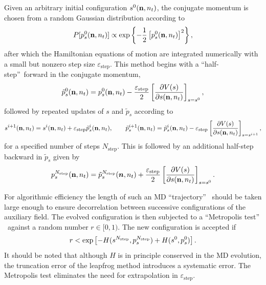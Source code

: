 Given an arbitrary initial configuration $s^{0}({{\bf n},n_t})$, the
conjugate momentum is chosen from a random Gaussian distribution according
to
\begin{equation}
P[p_s^{0}({\bf n},n_t)]\propto\exp\left\{  -\frac{1}{2}\left[  p_s^{0}({\bf
n},n_t)\right]  ^{2}\right\}  , \label{Gdistr}%
\end{equation}
after which the Hamiltonian equations of motion are integrated numerically
with a small but nonzero step size $\varepsilon_{\mathrm{step}}$.  This method begins
with a
\textquotedblleft half-step\textquotedblright\ forward in the conjugate
momentum,
\begin{equation}
\tilde{p}_s^{0}({\bf n},n_t)=p_s^{0}({\bf n},n_t)-\frac{\varepsilon
_{\mathrm{step}}}{2}\left[  \frac{\partial V(s)}{\partial s({\bf n},n_t%
)}\right]  _{s=s^{0}},
\end{equation}
followed by repeated updates of $s$ and $\tilde{p}_s$ according to
\begin{equation}
s^{i+1}({\bf n},n_t)=s^{i}({\bf n},n_t)+\varepsilon_{\mathrm{step}}%
\tilde{p}^{i}_s({\bf n},n_t),\quad\quad\tilde{p}^{i+1}_s({\bf n},n_t%
)=\tilde{p}^{i}_s({\bf n},n_t)-\varepsilon_{\mathrm{step}}\left[
\frac{\partial V(s)}{\partial s({\bf n},n_t)}\right]  _{s=s^{i+1}},
\end{equation}
for a specified number of steps $N_{\mathrm{step}}$. This is followed by an additional half-step
backward in $\tilde{p}_s$  given by
\begin{equation}
p_s^{N_{\mathrm{step}}}({\bf n},n_t)=\tilde{p}_s^{N_{\mathrm{step}}}(\vec
{n},n_t)+\frac{\varepsilon_{\mathrm{step}}}{2}\left[  \frac{\partial
V(s)}{\partial s({\bf n},n_t)}\right]  _{s=s^{0}}.
\end{equation}

For algorithmic efficiency the length of such an MD \textquotedblleft trajectory\textquotedblright%
\ should be taken large enough to ensure decorrelation between
successive configurations of the auxiliary field. The evolved configuration
is
then subjected to a \textquotedblleft Metropolis test\textquotedblright%
\ against a random number $r\in\lbrack0,1)$.  The new configuration is accepted if
\begin{equation}
r<\exp\left[  -H(s^{N_{\mathrm{step}}},p^{N_{\rm step }}_s)+H(s^{0}%
,p_s^{0})\right]  .
\end{equation}
It
should be noted that although $H$ is in principle conserved in the MD
evolution, the truncation error of the leapfrog method introduces a systematic
error. The Metropolis test eliminates the need for extrapolation in
$\varepsilon_{\mathrm{step}}$. 

